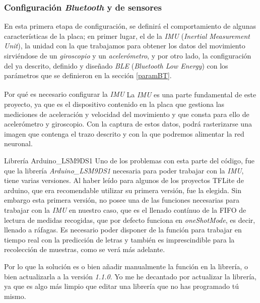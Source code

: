 \subsubsection{Configuración \textit{Bluetooth} y de sensores}
En esta primera etapa de configuración, se definirá el comportamiento de algunas
características de la placa; en primer lugar, el de la  \textit{IMU}
(\textit{Inertial Measurement Unit}), la unidad con la que trabajamos para
obtener los datos del movimiento sirviéndose de un \textit{giroscopio} y un
\textit{acelerómetro}, y por otro lado, la configuración del ya descrito,
definido y diseñado \textit{BLE} (\textit{Bluetooth Low Energy}) con
los parámetros que se definieron en la sección \ref{paramBT}.
\begin{teoria}{Por qué es necesario configurar la \textit{IMU}\textsuperscript{\cite{imuteoria}}}
    La \textit{IMU} es una parte fundamental de este proyecto, ya que es
    el dispositivo contenido en la placa que gestiona las mediciones de
    aceleración y velocidad del movimiento y que consta para ello de
    acelerómetro y giroscopio. Con la captura de estos datos, podrá rasterizarse
    una imagen que contenga el trazo descrito y con la que podremos alimentar
    la red neuronal.
\end{teoria}

\begin{problemas}{Librería Arduino\_LSM9DS1}
    \color{mitexto}
    Uno de los problemas con esta parte del código, fue que
    la librería \textit{Arduino\_LSM9DS1} necesaria para poder trabajar con
    la \textit{IMU}, tiene varias versiones.
    Al haber leído para algunos de los proyectos TFLite de
    arduino, que era recomendable utilizar su primera versión, fue la elegida.
    Sin embargo esta primera versión, no posee una de las funciones
    necesarias para trabajar con la \textit{IMU} en nuestro caso,
    que es el llenado
    contínuo de la FIFO de lectura de medidas recogidas, que por defecto
    funciona en \textit{oneShotMode}, es decir, llenado a ráfagas.
    Es necesario poder disponer de la función para trabajar en tiempo
    real con la predicción de letras y también es imprescindible para la
    recolección de muestras, como se verá más adelante.
    
    Por lo que la solución es o bien añadir manualmente la función en la
    librería, o bien actualizarla a la versión \textit{1.1.0}. Yo me he
    decantado por actualizar la librería, ya que es algo más limpio que
    editar una librería que no has programado tú mismo.
\end{problemas}

